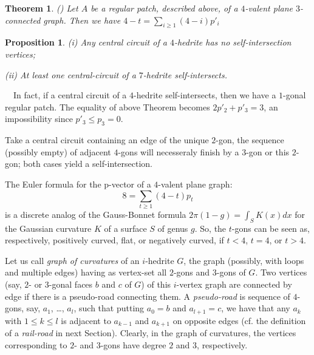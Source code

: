 \documentclass[12pt]{article}
\newtheorem{proposition}{Proposition}
\newtheorem{theorem}{Theorem}
\newcommand{\proof}{\noindent{\bf Proof.}\ \ }
\begin{document}
\begin{theorem} \label{Local-Euler-Formula}(\cite{DSt})
Let $A$ be a regular patch, described above, of a $4$-valent plane
$3$-connected graph. Then we have $4-t=\sum_{i\geq 1} (4-i)p'_i$
\end{theorem}



\begin{proposition}
(i) Any central circuit of a $4$-hedrite has no self-intersection vertices;

(ii) At least one central-circuit of a $7$-hedrite self-intersects.
\end{proposition}
\proof In fact, if a central circuit of a $4$-hedrite self-intersects, then we have a $1$-gonal regular patch. The equality of above Theorem becomes $2p'_2+p'_3=3$, an impossibility since $p'_3\leq p_3=0$.

Take a central circuit containing an edge of the unique $2$-gon, the sequence (possibly empty) of adjacent $4$-gons will necesseraly finish by a $3$-gon or this $2$-gon; both cases yield a self-intersection.






The Euler formula for the p-vector of a $4$-valent plane graph:
$$8=\sum_{t\geq 1} (4-t)p_t$$
is a discrete analog of the Gauss-Bonnet formula $2\pi(1-g)=\int_{S} K(x)dx$ for the Gaussian curvature $K$ of a surface $S$ of genus $g$. So, the $t$-gons can be seen as, respectively, positively curved, flat, or negatively curved, if $t<4$, $t=4$, or $t>4$.


Let us call {\em graph of curvatures} of an $i$-hedrite $G$, the
graph (possibly, with loops and multiple edges) having as vertex-set
all $2$-gons and $3$-gons of $G$. 
Two vertices (say, $2$- or $3$-gonal faces $b$ and $c$ of $G$) of 
this $i$-vertex graph are connected by edge if there is a pseudo-road 
connecting them. A {\em pseudo-road} is sequence of $4$-gons, say,
$a_1$, \dots, $a_l$, such that putting $a_0=b$ and $a_{l+1}=c$, 
we have that any $a_k$ with $1\leq k\leq l$ is adjacent to $a_{k-1}$ 
and $a_{k+1}$ on opposite edges (cf. the definition of
a {\em rail-road} in next Section). Clearly, in the graph of curvatures, 
the vertices corresponding to $2$- and $3$-gons have degree $2$ and $3$, 
respectively.
\end{document}

